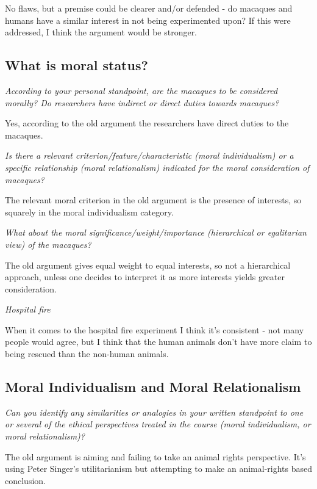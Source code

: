 \documentclass{article}
\begin{document}
			No flaws, but a premise could be clearer and/or defended - do macaques and humans have a similar interest in not being experimented upon? If this were addressed, I think the argument would be stronger.
			
		\subsection{What is moral status?}

			\textit{According to your personal standpoint, are the macaques to be considered morally? Do
researchers have indirect or direct duties towards macaques? }		
			
			Yes, according to the old argument the researchers have direct duties to the macaques.

			\textit{Is there a relevant criterion/feature/characteristic (moral individualism) or a specific
relationship (moral relationalism) indicated for the moral consideration of macaques?}
			
			The relevant moral criterion in the old argument is the presence of interests, so squarely in the moral individualism category.
			
			\textit{What about the moral significance/weight/importance (hierarchical or egalitarian view) of the
macaques?}

			The old argument gives equal weight to equal interests, so not a hierarchical approach, unless one decides to interpret it as more interests yields greater consideration.
			
			\textit{Hospital fire}
			
			When it comes to the hospital fire experiment I think it's consistent - not many people would agree, but I think that the human animals don't have more claim to being rescued than the non-human animals.
			
		\subsection{Moral Individualism and Moral Relationalism}
		
			\textit{Can you identify any similarities or analogies in your written standpoint to one or several of the
ethical perspectives treated in the course (moral individualism, or moral relationalism)? }

			The old argument is aiming and failing to take an animal rights perspective. It's using Peter Singer's utilitarianism but attempting to make an animal-rights based conclusion.
			
\end{document}
